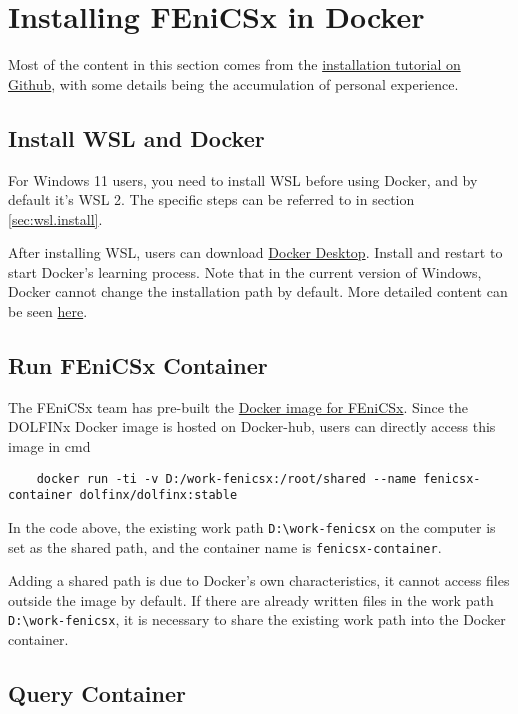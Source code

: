 \documentclass{report}
\begin{document}
\chapter{Installing FEniCSx in Docker}

Most of the content in this section comes from the \href{https://github.com/FEniCS/dolfinx#docker-images}{installation tutorial on Github}, with some details being the accumulation of personal experience.

\section{Install WSL and Docker}

For Windows 11 users, you need to install WSL before using Docker, and by default it's WSL 2. The specific steps can be referred to in section \ref{sec:wsl.install}.

After installing WSL, users can download \href{https://www.docker.com/get-started}{Docker Desktop}. Install and restart to start Docker's learning process. Note that in the current version of Windows, Docker cannot change the installation path by default. More detailed content can be seen \href{https://docs.docker.com/desktop/windows/install/}{here}.

\section{Run FEniCSx Container}

The FEniCSx team has pre-built the \href{https://hub.docker.com/u/dolfinx}{Docker image for FEniCSx}. Since the DOLFINx Docker image is hosted on Docker-hub, users can directly access this image in \textsf{cmd}
\begin{lstlisting}
	docker run -ti -v D:/work-fenicsx:/root/shared --name fenicsx-container dolfinx/dolfinx:stable
\end{lstlisting}
In the code above, the existing work path \texttt{D:\textbackslash work-fenicsx} on the computer is set as the shared path, and the container name is \texttt{fenicsx-container}.

Adding a shared path is due to Docker's own characteristics, it cannot access files outside the image by default. If there are already written files in the work path \texttt{D:\textbackslash work-fenicsx}, it is necessary to share the existing work path into the Docker container.

\section{Query Container}
\end{document}
